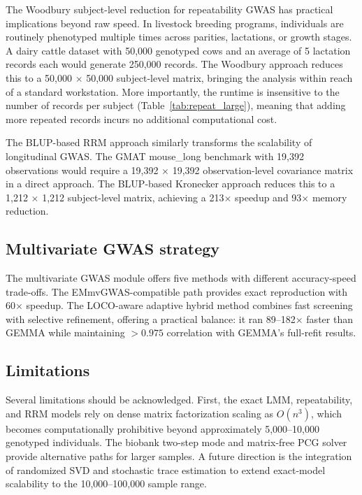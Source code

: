 \documentclass[11pt,a4paper]{article}
\begin{document}
The Woodbury subject-level reduction for repeatability GWAS has practical implications beyond raw speed. In livestock breeding programs, individuals are routinely phenotyped multiple times across parities, lactations, or growth stages. A dairy cattle dataset with 50,000 genotyped cows and an average of 5 lactation records each would generate 250,000 records. The Woodbury approach reduces this to a 50,000 $\times$ 50,000 subject-level matrix, bringing the analysis within reach of a standard workstation. More importantly, the runtime is insensitive to the number of records per subject (Table~\ref{tab:repeat_large}), meaning that adding more repeated records incurs no additional computational cost.

The BLUP-based RRM approach similarly transforms the scalability of longitudinal GWAS. The GMAT mouse\_long benchmark with 19,392 observations would require a 19,392 $\times$ 19,392 observation-level covariance matrix in a direct approach. The BLUP-based Kronecker approach reduces this to a 1,212 $\times$ 1,212 subject-level matrix, achieving a 213$\times$ speedup and 93$\times$ memory reduction.

\subsection{Multivariate GWAS strategy}

The multivariate GWAS module offers five methods with different accuracy-speed trade-offs. The EMmvGWAS-compatible path provides exact reproduction with 60$\times$ speedup. The LOCO-aware adaptive hybrid method combines fast screening with selective refinement, offering a practical balance: it ran 89--182$\times$ faster than GEMMA while maintaining $> 0.975$ correlation with GEMMA's full-refit results.

\subsection{Limitations}

Several limitations should be acknowledged. First, the exact LMM, repeatability, and RRM models rely on dense matrix factorization scaling as $O(n^3)$, which becomes computationally prohibitive beyond approximately 5,000--10,000 genotyped individuals. The biobank two-step mode and matrix-free PCG solver provide alternative paths for larger samples. A future direction is the integration of randomized SVD and stochastic trace estimation to extend exact-model scalability to the 10,000--100,000 sample range.
\end{document}
